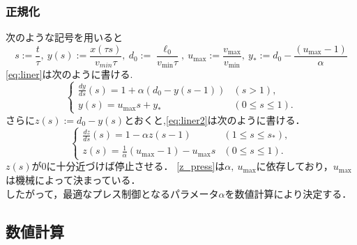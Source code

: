 \documentclass [dvipdfmx] {jsarticle}
\numberwithin{equation}{section}
\theoremstyle{definition} %
\theoremstyle{definition} %
\begin{document}
\subsubsection{正規化}
次のような記号を用いると
\begin{equation}
    s:=\displaystyle\frac{t}{\tau},\ y(s):=\displaystyle\frac{x(\tau s)}{v_{min}\tau},\
    d_0:=\frac{\ell_0}{v_{\min}\tau},\ u_{\max}:=\displaystyle\frac{v_{\max}}{v_{\min}},\ 
    y_\ast:=d_0-\displaystyle\frac{(u_{\max}-1)}{\alpha}
\end{equation}
\eqref{eq:liner}は次のように書ける.
\begin{equation}\label{eq:liner2}\begin{cases}
    \displaystyle\frac{dy}{ds}(s)=1+\alpha(d_0-y(s-1)) &(s>1),\\
    y(s)=u_{\max}s+y_\ast &(0\le s \le 1).
\end{cases}\end{equation}
さらに$z(s):=d_0-y(s)$とおくと,\eqref{eq:liner2}は次のように書ける．
\begin{equation}\label{z_press}\begin{cases}
    \displaystyle\frac{dz}{ds}(s)=1-\alpha z(s-1) &(1\le s\le s_\ast),\\
    z(s)=\displaystyle\frac{1}{\alpha}(u_{\max}-1)-u_{\max}s &(0\le s\le 1).
\end{cases}\end{equation}
$z(s)$が$0$に十分近づけば停止させる．
\eqref{z_press}は$\alpha,\ u_{\max}$に依存しており，$u_{\max}$は機械によって決まっている．\\
したがって，最適なプレス制御となるパラメータ$\alpha$を数値計算により決定する．


\subsection{数値計算}
\end{document}
